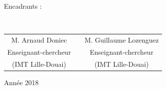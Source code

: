 \begin{titlepage}
\noindent\parbox{\textwidth}{Encadrants :}\\[0.5cm]

\noindent\begin{tabular}{cp{1cm}c}
\large M. Arnaud Doniec     & & \large M. Guillaume Lozenguez \\[6pt]
Enseignant-chercheur & & Enseignant-chercheur\\[3pt]
(IMT Lille-Douai)   & & (IMT Lille-Douai)\\[1cm]

\end{tabular}

\vspace{5mm}
{Année 2018}\\[0.5cm]
\bigskip



\end{titlepage}